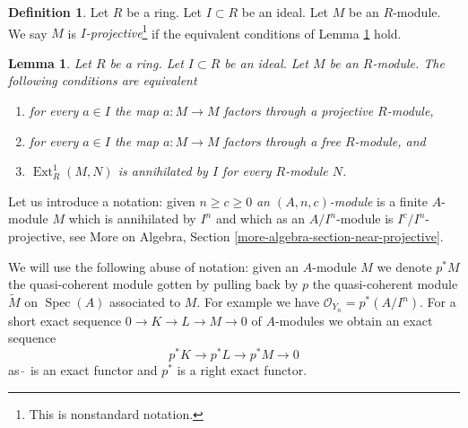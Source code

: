 \documentclass{amsart}
\theoremstyle{plain}
\newtheorem{lemma}[subsection]{Lemma}
\theoremstyle{definition}
\newtheorem{definition}[subsection]{Definition}
\theoremstyle{remark}
\numberwithin{equation}{subsection}
\def\Spec{\mathop{\mathrm{Spec}}}
\def\Ext{\mathop{\mathrm{Ext}}\nolimits}
\begin{document}
\begin{definition}
\label{more-algebra-definition-near-projective}
Let $R$ be a ring. Let $I \subset R$ be an ideal. Let $M$ be an $R$-module.
We say $M$ is {\it $I$-projective}\footnote{This is nonstandard notation.}
if the equivalent conditions of Lemma \ref{more-algebra-lemma-near-projective} hold.
\end{definition}

\begin{lemma}
\label{more-algebra-lemma-near-projective}
Let $R$ be a ring. Let $I \subset R$ be an ideal. Let $M$ be an $R$-module.
The following conditions are equivalent
\begin{enumerate}
\item for every $a \in I$ the map $a : M \to M$ factors through a projective
$R$-module,
\item for every $a \in I$ the map $a : M \to M$ factors through a free
$R$-module, and
\item $\Ext^1_R(M, N)$ is annihilated by $I$ for every $R$-module $N$.
\end{enumerate}
\end{lemma}

\noindent
Let us introduce a notation: given $n \geq c \geq 0$
{\it an $(A, n, c)$-module}
is a finite $A$-module $M$ which is annihilated by $I^n$
and which as an $A/I^n$-module is $I^c/I^n$-projective, see
More on Algebra, Section \ref{more-algebra-section-near-projective}.

\medskip\noindent
We will use the following abuse of notation: given an $A$-module $M$
we denote $p^*M$ the quasi-coherent module gotten by pulling back by $p$
the quasi-coherent module $\widetilde{M}$ on $\Spec(A)$ associated to $M$.
For example we have $\mathcal{O}_{Y_n} = p^*(A/I^n)$.
For a short exact sequence $0 \to K \to L \to M \to 0$ of $A$-modules
we obtain an exact sequence
$$
p^*K \to p^*L \to p^*M \to 0
$$
as $\widetilde{\ }$ is an exact functor and $p^*$ is a right exact functor.
\end{document}
